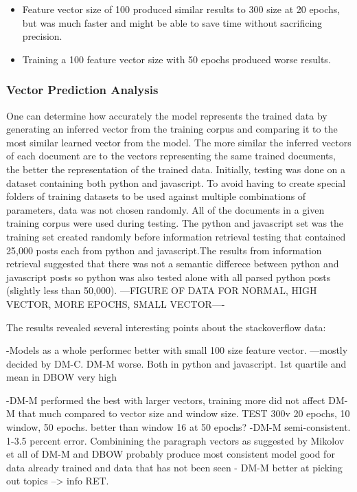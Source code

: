 \begin{itemize}
  \item Feature vector size of 100 produced similar results to 300 size at 20 epochs, but was much faster and might be able to save time without sacrificing precision.
  \item Training a 100 feature vector size with 50 epochs produced worse results.
\end{itemize}

 

\subsubsection{Vector Prediction Analysis}

One can determine how accurately the model represents the trained data by generating an inferred vector from the training corpus and comparing it to the most similar learned vector from the model. The more similar the inferred vectors of each document are to the vectors representing the same trained documents, the better the representation of the trained data. Initially, testing was done on a dataset containing both python and javascript. To avoid having to create special folders of training datasets to be used against multiple combinations of parameters, data was not chosen randomly. All of the documents in a given training corpus were used during testing. The python and javascript set was the training set created randomly before information retrieval testing that contained 25,000 posts each from python and javascript.The results from information retrieval suggested that there was not a semantic differece between python and javascript posts so python was also tested alone with all parsed python posts (slightly less than 50,000). ---FIGURE OF DATA FOR NORMAL, HIGH VECTOR, MORE EPOCHS, SMALL VECTOR----

The results revealed several interesting points about the stackoverflow data:

-Models as a whole performec better with small 100 size feature vector. ---mostly decided by DM-C. DM-M worse. Both in python and javascript. 1st quartile and mean in DBOW very high

-DM-M performed the best with larger vectors, training more did not affect DM-M that much compared to vector size and window size. TEST 300v 20 epochs, 10 window, 50 epochs. better than window 16 at 50 epochs? 
-DM-M semi-consistent. 1-3.5 percent error. Combinining the paragraph vectors as suggested by Mikolov et all of DM-M and DBOW probably produce most consistent model good for data already trained and data that has not been seen - DM-M better at picking out topics  --> info RET.

